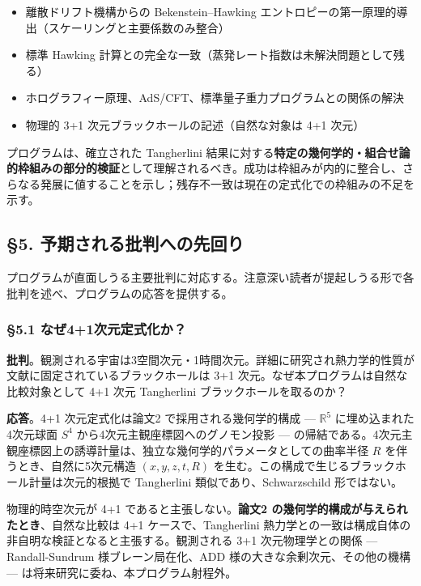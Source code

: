 \documentclass[a4paper,11pt]{ltjsarticle}
\theoremstyle{definition}
\providecommand{\tightlist}{\setlength{\itemsep}{0pt}\setlength{\parskip}{0pt}}
\begin{document}
\begin{itemize}
\tightlist
\item
  離散ドリフト機構からの Bekenstein--Hawking
  エントロピーの第一原理的導出（スケーリングと主要係数のみ整合）
\item
  標準 Hawking
  計算との完全な一致（蒸発レート指数は未解決問題として残る）
\item
  ホログラフィー原理、AdS/CFT、標準量子重力プログラムとの関係の解決
\item
  物理的 3+1 次元ブラックホールの記述（自然な対象は 4+1 次元）
\end{itemize}

プログラムは、確立された Tangherlini
結果に対する\textbf{特定の幾何学的・組合せ論的枠組みの部分的検証}として理解されるべき。成功は枠組みが内的に整合し、さらなる発展に値することを示し；残存不一致は現在の定式化での枠組みの不足を示す。

\subsection{§5.
予期される批判への先回り}\label{ux4e88ux671fux3055ux308cux308bux6279ux5224ux3078ux306eux5148ux56deux308a}

プログラムが直面しうる主要批判に対応する。注意深い読者が提起しうる形で各批判を述べ、プログラムの応答を提供する。

\subsubsection{§5.1
なぜ4+1次元定式化か？}\label{ux306aux305c41ux6b21ux5143ux5b9aux5f0fux5316ux304b}

\textbf{批判}。観測される宇宙は3空間次元・1時間次元。詳細に研究され熱力学的性質が文献に固定されているブラックホールは
3+1 次元。なぜ本プログラムは自然な比較対象として 4+1 次元 Tangherlini
ブラックホールを取るのか？

\textbf{応答}。4+1 次元定式化は論文2 で採用される幾何学的構成 ---
\(\mathbb{R}^5\) に埋め込まれた4次元球面 \(S^4\)
から4次元主観座標図へのグノモン投影 ---
の帰結である。4次元主観座標図上の誘導計量は、独立な幾何学的パラメータとしての曲率半径
\(R\) を伴うとき、自然に5次元構造 \((x, y, z, t, R)\)
を生む。この構成で生じるブラックホール計量は次元的根拠で Tangherlini
類似であり、Schwarzschild 形ではない。

物理的時空次元が 4+1 であると主張しない。\textbf{論文2
の幾何学的構成が与えられたとき}、自然な比較は 4+1 ケースで、Tangherlini
熱力学との一致は構成自体の非自明な検証となると主張する。観測される 3+1
次元物理学との関係 --- Randall-Sundrum 様ブレーン局在化、ADD
様の大きな余剰次元、その他の機構 ---
は将来研究に委ね、本プログラム射程外。
\end{document}
